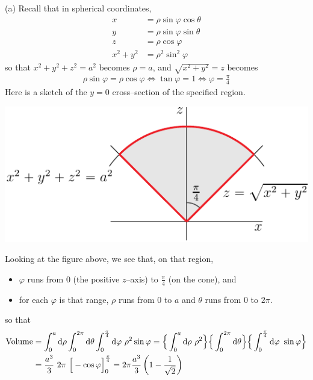 \begin{solution}
(a)
Recall that in spherical coordinates,
\begin{align*}
x&=\rho\sin\varphi\cos\theta \\
y&=\rho\sin\varphi\sin\theta \\
z&=\rho\cos\varphi \\
x^2+y^2 &=\rho^2\sin^2\varphi
\end{align*}
so that $x^2+y^2+z^2= a^2$ becomes $\rho = a$,
and $\sqrt{x^2+y^2}= z$ becomes
\begin{align*}
\rho\sin\varphi = \rho\cos\varphi 
\iff
\tan\varphi= 1
\iff
\varphi=\frac{\pi}{4}
\end{align*}
Here is a sketch of the $y=0$ cross--section of the specified region.
\begin{center}
     \includegraphics{fig/coneSphere.pdf}
\end{center}
Looking at the figure above, we see that, on that region,
\begin{itemize}
\item 
  $\varphi$ runs from $0$ (the positive $z$--axis) to
    $\frac{\pi}{4}$ (on the cone), and
\item
  for each $\varphi$ is that range, $\rho$ runs from $0$  to $a$
  and $\theta$ runs from $0$ to $2\pi$.
\end{itemize}
so that
\begin{align*}
\text{Volume} 
&= \int_{0}^{a}\mathrm{d}\rho  \int_{0}^{2\pi} \mathrm{d}\theta
\int_0^{{\pi\over 4}}\mathrm{d}\varphi\ \rho^2\sin\varphi
= \Big\{\int_{0}^{a}\mathrm{d}\rho\ \rho^2  \Big\}\Big\{\int_{0}^{2\pi} \mathrm{d}\theta\Big\}\Big\{
\int_0^{{\pi\over 4}}\mathrm{d}\varphi\ \sin\varphi\Big\} \\
&= \frac{a^3}{3}\ 2\pi\ \Big[-\cos\varphi\Big]_0^{{\pi\over 4}}
=2\pi\frac{a^3}{3}\left(1-\frac{1}{\sqrt{2}}\right)
\end{align*}


\end{solution}
